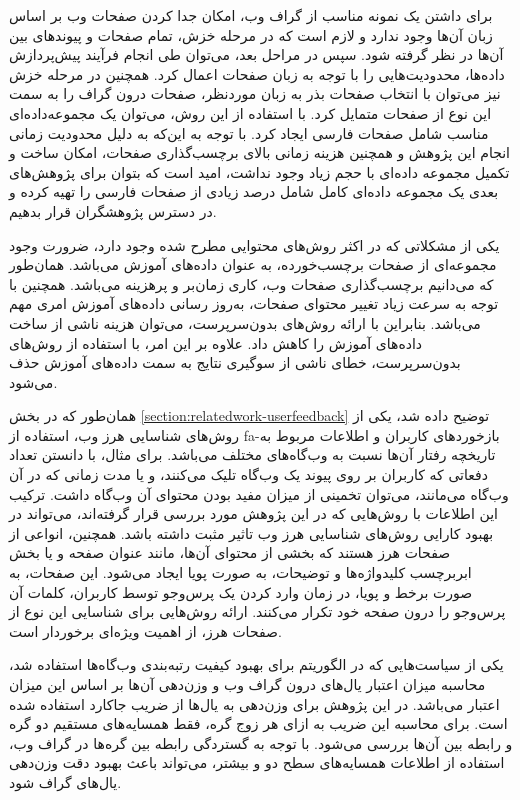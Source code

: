 \documentclass[twoside, a4paper,11pt]{book}
\numberwithin{equation}{chapter}
\numberwithin{table}{chapter}
\numberwithin{figure}{chapter}
\numberwithin{equation}{chapter}
\newcommand{\mls}[1]{\gls{fa-#1}\glsuseri{la-#1}}
\begin{document}
برای داشتن یک نمونه مناسب از گراف وب، امکان جدا کردن صفحات وب بر اساس زبان آن‌ها وجود ندارد و لازم است که در مرحله خزش، تمام صفحات و پیوندهای بین آن‌ها در نظر گرفته شود. سپس در مراحل بعد، می‌توان طی انجام فرآیند پیش‌پردازش داده‌ها، محدودیت‌‌هایی را با توجه به زبان صفحات اعمال کرد. همچنین در مرحله خزش نیز می‌توان با انتخاب صفحات بذر به زبان موردنظر، صفحات درون گراف را به سمت این نوع از صفحات متمایل کرد. با استفاده از این روش، می‌توان یک مجموعه‌داده‌ای مناسب شامل صفحات فارسی ایجاد کرد. با توجه به این‌که به دلیل محدودیت زمانی انجام این پژوهش و همچنین هزینه زمانی بالای برچسب‌گذاری صفحات، امکان ساخت و تکمیل  مجموعه داده‌ای با حجم زیاد وجود نداشت، امید است که بتوان برای پژوهش‌های بعدی یک مجموعه داده‌ای کامل شامل درصد زیادی از صفحات فارسی را تهیه کرده و در دسترس پژوهشگران قرار بدهیم.

یکی از مشکلاتی که در اکثر روش‌های محتوایی مطرح شده وجود دارد، ضرورت وجود مجموعه‌ای از صفحات برچسب‌خورده، به عنوان داده‌های آموزش می‌باشد. همان‌طور که می‌دانیم برچسب‌گذاری صفحات وب، کاری زما‌ن‌بر و پرهزینه می‌باشد. همچنین با توجه به سرعت زیاد تغییر محتوای صفحات، به‌روز رسانی داده‌های آموزش امری مهم می‌باشد. بنابراین با ارائه روش‌های بدون‌سرپرست، می‌توان هزینه ناشی از ساخت داده‌های آموزش را کاهش داد. علاوه بر این امر، با استفاده از روش‌های بدون‌سرپرست، خطای ناشی از سوگیری نتایج به سمت داده‌های آموزش حذف می‌شود.

همان‌طور که در بخش \ref{section:relatedwork-userfeedback} توضیح داده شد، یکی از روش‌های شناسایی هرز وب، استفاده از \mls{بازخورد}‌های کاربران و اطلاعات مربوط به تاریخچه رفتار آن‌ها نسبت به وب‌گاه‌‌های مختلف می‌باشد. برای مثال، با دانستن تعداد دفعاتی که کاربران بر روی پیوند یک وب‌گاه تلیک می‌کنند، و یا مدت زمانی که در آن وب‌گاه می‌مانند، می‌توان تخمینی از میزان مفید بودن محتوای آن وب‌گاه داشت. ترکیب این اطلاعات با روش‌هایی که در این پژوهش مورد بررسی قرار گرفته‌اند، می‌تواند در بهبود کارایی روش‌های شناسایی هرز وب تاثیر مثبت داشته باشد. همچنین، انواعی از صفحات هرز هستند که بخشی از محتوای آن‌ها، مانند عنوان صفحه و یا بخش ابربرچسب کلیدواژه‌ها و توضیحات، به صورت پویا ایجاد می‌شود. این صفحات، به صورت برخط و پویا، در زمان وارد کردن یک پرس‌وجو توسط کاربران، کلمات آن پرس‌وجو را درون صفحه خود تکرار می‌کنند. ارائه روش‌هایی برای شناسایی این نوع از صفحات هرز، از اهمیت ویژه‌ای برخوردار است.

یکی از سیاست‌‌هایی که در الگوریتم  برای بهبود کیفیت رتبه‌بندی وب‌گاه‌ها استفاده شد، محاسبه میزان اعتبار یال‌های درون گراف وب و وزن‌دهی آن‌ها بر اساس این میزان اعتبار می‌باشد. در این پژوهش برای وزن‌دهی به یال‌ها از ضریب جاکارد استفاده شده است. برای محاسبه این ضریب به ازای هر زوج گره، فقط همسایه‌های مستقیم دو گره و رابطه بین آن‌ها بررسی می‌شود. با توجه به گستردگی رابطه بین گره‌ها در گراف وب، استفاده از اطلاعات همسایه‌های سطح دو و بیشتر، می‌تواند باعث بهبود دقت وزن‌دهی یال‌های گراف شود.
\end{document}
